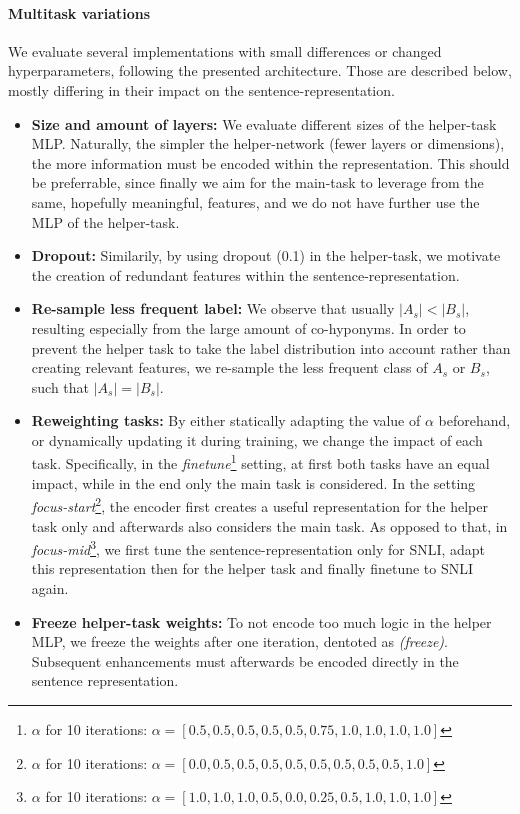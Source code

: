 \paragraph*{Multitask variations}
We evaluate several implementations with small differences or changed hyperparameters, following the presented architecture. Those are described below, mostly differing in their impact on the sentence-representation. 
\begin{itemize}
\item \textbf{Size and amount of layers:} We evaluate different sizes of the helper-task \ac{MLP}. Naturally, the simpler the helper-network (fewer layers or dimensions), the more information must be encoded within the representation. This should be preferrable, since finally we aim for the main-task to leverage from the same, hopefully meaningful, features, and we do not have further use the \ac{MLP} of the helper-task.
\item  \textbf{Dropout:} Similarily, by using dropout (0.1) in the helper-task, we motivate the creation of redundant features within the sentence-representation.
\item \textbf{Re-sample less frequent label:} We observe that usually $|A_s| < |B_s|$, resulting especially from the large amount of co-hyponyms. In order to prevent the helper task to take the label distribution into account rather than creating relevant features, we re-sample the less frequent class of $A_s$ or $B_s$, such that $|A_s| = |B_s|$.
\item \textbf{Reweighting tasks:} By either statically adapting the value of $\alpha$ beforehand, or dynamically updating it during training, we change the impact of each task. Specifically, in the \textit{finetune}\footnote{$\alpha$ for 10 iterations: $\alpha = [0.5, 0.5, 0.5, 0.5, 0.5, 0.75, 1.0, 1.0, 1.0, 1.0]$} setting, at first both tasks have an equal impact, while in the end only the main task is considered. In the setting \textit{focus-start}\footnote{$\alpha$ for 10 iterations: $\alpha = [0.0, 0.5, 0.5, 0.5, 0.5, 0.5, 0.5, 0.5, 0.5, 1.0]$}, the encoder first creates a useful representation for the helper task only and afterwards also considers the main task. As opposed to that, in \textit{focus-mid}\footnote{$\alpha$ for 10 iterations: $\alpha = [1.0, 1.0, 1.0, 0.5, 0.0, 0.25, 0.5, 1.0, 1.0, 1.0]$}, we first tune the sentence-representation only for \ac{SNLI}, adapt this representation then for the helper task and finally finetune to \ac{SNLI} again.
\item \textbf{Freeze helper-task weights:} To not encode too much logic in the helper \ac{MLP}, we freeze the weights after one iteration, dentoted as \textit{(freeze)}. Subsequent enhancements must afterwards be encoded directly in the sentence representation. 

\end{itemize}
